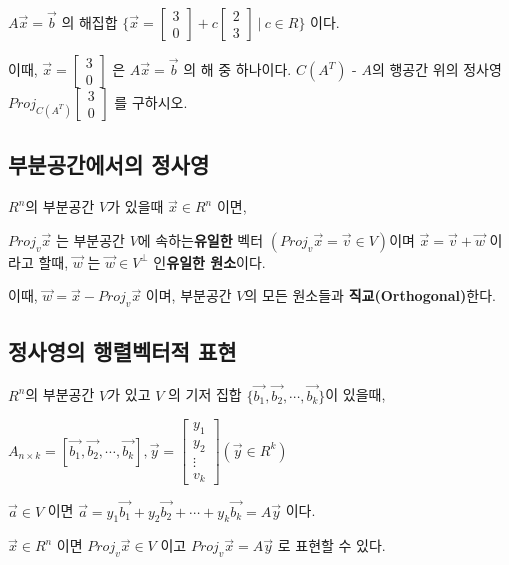 $A\vec{x} = \vec{b}$ 의 해집합 $\{ \vec{x} = \begin{bmatrix} 3 \\ 0 \end{bmatrix} + c \begin{bmatrix} 2 \\ 3 \end{bmatrix} \ \vert \ c \in R \}$ 이다.

이때, $\vec{x} = \begin{bmatrix} 3 \\ 0 \end{bmatrix}$ 은 $A\vec{x} = \vec{b}$ 의 해 중 하나이다. $C(A^T)$ - $A$의 행공간 위의 정사영 $Proj_{C(A^T)} \begin{bmatrix} 3 \\ 0 \end{bmatrix}$ 를 구하시오.

\newpage
\subsection{부분공간에서의 정사영}
\begin{theorem}
$R^n$의 부분공간 $V$가 있을때 $\vec{x} \in R^n$ 이면,

$Proj_v \vec{x}$ 는 부분공간 $V$에 속하는\textbf{유일한} 벡터 $(Proj_v \vec{x} = \vec{v} \in V)$이며 $\vec{x} = \vec{v} + \vec{w}$ 이라고 할때, $\vec{w}$ 는 $\vec{w} \in V^\perp$ 인\textbf{유일한 원소}이다.

이때, $\vec{w} = \vec{x} - Proj_v \vec{x}$ 이며, 부분공간 $V$의 모든 원소들과 \textbf{직교(Orthogonal)}한다.
\end{theorem}

\newpage
\subsection{정사영의 행렬벡터적 표현}
\begin{theorem}
$R^n$의 부분공간 $V$가 있고 $V$ 의 기저 집합 $\{\vec{b_1}, \vec{b_2}, \cdots, \vec{b_k}\}$이 있을때,

$A_{n \times k} =  [\vec{b_1}, \vec{b_2}, \cdots, \vec{b_k}], \vec{y} = \begin{bmatrix} y_1 \\ y_2 \\ \vdots \\ v_k \end{bmatrix}  (\vec{y} \in R^k)$

$\vec{a} \in V$ 이면 $\vec{a} = y_1\vec{b_1} + y_2\vec{b_2} + \cdots + y_k\vec{b_k} = A\vec{y}$ 이다.

$\vec{x} \in R^n$ 이면 $Proj_v\vec{x} \in V$ 이고 $Proj_v\vec{x} = A\vec{y}$ 로 표현할 수 있다.
\end{theorem}

